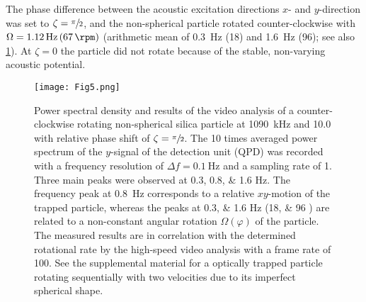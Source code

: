 The phase difference between the acoustic excitation directions $x$- and 
$y$-direction was set to $\zeta=\sfrac{\pi}{2}$, and the non-spherical particle 
rotated counter-clockwise with $\Omega = \SI{1.12}{\hertz}\,(\SI{67}{\rpm})$ 
(arithmetic mean of \SI{0.3}{\hertz} (\SI{18}{\rpm}) and \SI{1.6}{\hertz} 
(\SI{96}{\rpm}); see also \cref{fig:Fig5}). At $\zeta=0$ the particle did not 
rotate because of the stable, non-varying acoustic potential.

\begin{figure}
    \centering
    \texttt{[image: Fig5.png]}
    \caption{Power spectral density and results of the video analysis of a 
      counter-clockwise rotating non-spherical silica particle at 
      \SI{1090}{\kilo\hertz} and \SI{10.0}{\Vrms} with relative phase shift of 
      $\zeta= \sfrac{\pi}{2}$. The 10 times averaged power spectrum of the 
      $y$-signal of the detection unit (QPD) was recorded with a frequency 
      resolution of $\Delta f = \SI{0.1}{\hertz}$ and a sampling rate of 
      \SI{1}{\MS}. Three main peaks were observed at \numlist{0.3; 0.8; 1.6} 
      \si{\hertz}. The frequency peak at \SI{0.8}{\hertz} corresponds to a 
      relative $xy$-motion of the trapped particle, whereas the peaks at 
      \numlist{0.3; 1.6} \si{\hertz} (\numlist{18;96} \si{\rpm}) are related to 
      a non-constant angular rotation $\Omega(\varphi)$ of the particle. The 
      measured results are in correlation with the determined rotational rate by 
      the high-speed video analysis with a frame rate of \SI{100}{\fps}. See the 
      supplemental material for a optically trapped particle rotating 
      sequentially with two velocities due to its imperfect spherical 
  shape.\label{fig:Fig5}}
\end{figure}%

